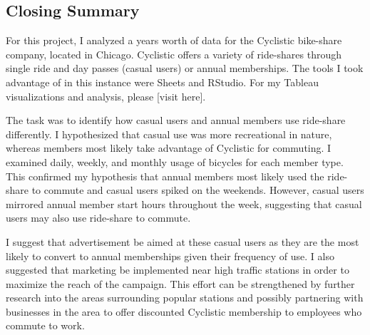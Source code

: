 \documentclass[
]{article}
\begin{document}
\hypertarget{closing-summary}{%
\subsection{Closing Summary}\label{closing-summary}}

For this project, I analyzed a years worth of data for the Cyclistic
bike-share company, located in Chicago. Cyclistic offers a variety of
ride-shares through single ride and day passes (casual users) or annual
memberships. The tools I took advantage of in this instance were Sheets
and RStudio. For my Tableau visualizations and analysis, please {[}visit
here{]}.

The task was to identify how casual users and annual members use
ride-share differently. I hypothesized that casual use was more
recreational in nature, whereas members most likely take advantage of
Cyclistic for commuting. I examined daily, weekly, and monthly usage of
bicycles for each member type. This confirmed my hypothesis that annual
members most likely used the ride-share to commute and casual users
spiked on the weekends. However, casual users mirrored annual member
start hours throughout the week, suggesting that casual users may also
use ride-share to commute.

I suggest that advertisement be aimed at these casual users as they are
the most likely to convert to annual memberships given their frequency
of use. I also suggested that marketing be implemented near high traffic
stations in order to maximize the reach of the campaign. This effort can
be strengthened by further research into the areas surrounding popular
stations and possibly partnering with businesses in the area to offer
discounted Cyclistic membership to employees who commute to work.
\end{document}
